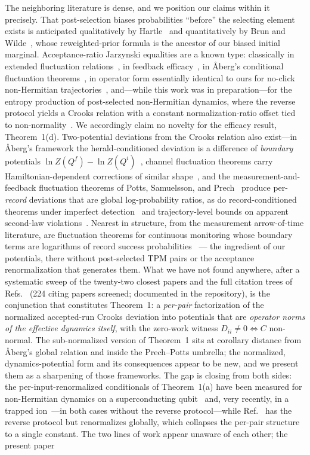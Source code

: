 \documentclass[aps,pra,twocolumn,superscriptaddress,nofootinbib]{revtex4-2}
\begin{document}
The neighboring literature is dense, and we position our claims within it precisely. That post-selection biases probabilities ``before'' the selecting element exists is anticipated qualitatively by Hartle~\cite{hartle1994} and quantitatively by Brun and Wilde~\cite{brunwilde2012}, whose reweighted-prior formula is the ancestor of our biased initial marginal. Acceptance-ratio Jarzynski equalities are a known type: classically in extended fluctuation relations~\cite{junier2009}, in feedback efficacy~\cite{sagawaueda2010}, in {\AA}berg's conditional fluctuation theorems~\cite{aberg2018}, in operator form essentially identical to ours for no-click non-Hermitian trajectories~\cite{malakarsilva2025}, and---while this work was in preparation---for the entropy production of post-selected non-Hermitian dynamics, where the reverse protocol yields a Crooks relation with a constant normalization-ratio offset tied to non-normality~\cite{cavina2026}. We accordingly claim no novelty for the efficacy result, Theorem~1(d). Two-potential deviations from the Crooks relation also exist---in {\AA}berg's framework the herald-conditioned deviation is a difference of \emph{boundary} potentials $\ln Z(Q^f)-\ln Z(Q^i)$~\cite{aberg2018}, channel fluctuation theorems carry Hamiltonian-dependent corrections of similar shape~\cite{kwonkim2019,albash2013,rastegin2014,maeda2023}, and the measurement-and-feedback fluctuation theorems of Potts, Samuelsson, and Prech~\cite{pottssamuelsson2018,prechpotts2024} produce per-\emph{record} deviations that are global log-probability ratios, as do record-conditioned theorems under imperfect detection~\cite{ferricortes2025} and trajectory-level bounds on apparent second-law violations~\cite{salazar2026}. Nearest in structure, from the measurement arrow-of-time literature, are fluctuation theorems for continuous monitoring whose boundary terms are logarithms of record success probabilities~\cite{manikandan2019} --- the ingredient of our potentials, there without post-selected TPM pairs or the acceptance renormalization that generates them. What we have not found anywhere, after a systematic sweep of the twenty-two closest papers and the full citation trees of Refs.~\cite{aberg2018,albash2013} (224 citing papers screened; documented in the repository), is the conjunction that constitutes Theorem~1: a \emph{per-pair} factorization of the normalized accepted-run Crooks deviation into potentials that are \emph{operator norms of the effective dynamics itself}, with the zero-work witness $D_{ii}\neq 0\iff C$ non-normal. The sub-normalized version of Theorem~1 sits at corollary distance from {\AA}berg's global relation and inside the Prech--Potts umbrella; the normalized, dynamics-potential form and its consequences appear to be new, and we present them as a sharpening of those frameworks. The gap is closing from both sides: the per-input-renormalized conditionals of Theorem~1(a) have been measured for non-Hermitian dynamics on a superconducting qubit~\cite{erdamar2024} and, very recently, in a trapped ion~\cite{nhje2026}---in both cases without the reverse protocol---while Ref.~\cite{cavina2026} has the reverse protocol but renormalizes globally, which collapses the per-pair structure to a single constant. The two lines of work appear unaware of each other; the present paper 
\end{document}
